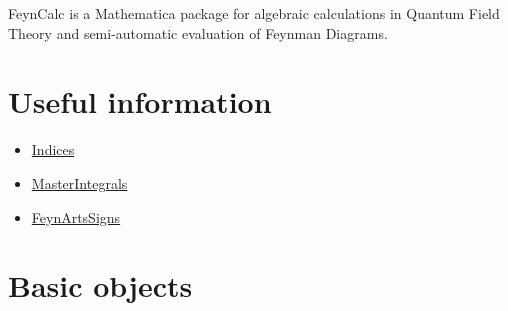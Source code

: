 \documentclass[../FeynCalcManual.tex]{subfiles}
\begin{document}
FeynCalc is a Mathematica package for algebraic calculations in Quantum
Field Theory and semi-automatic evaluation of Feynman Diagrams.

\hypertarget{useful information}{
\section{Useful information}\label{useful information}}

\begin{itemize}
\tightlist
\item
  \hyperlink{indices}{Indices}
\item
  \hyperlink{masterintegrals}{MasterIntegrals}
\item
  \hyperlink{feynartssigns}{FeynArtsSigns}
\end{itemize}

\hypertarget{basic objects}{
\section{Basic objects}\label{basic objects}}
\end{document}
